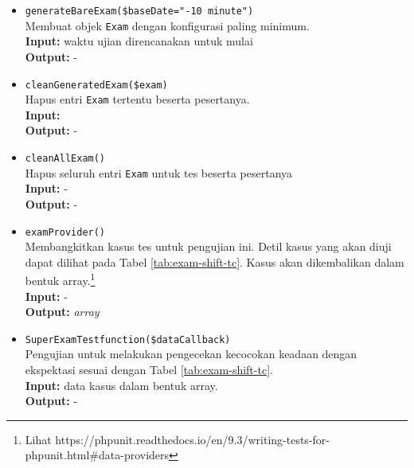 \begin{itemize}
\begin{itemize}
                    \item \texttt{generateBareExam(\$baseDate="-10 minute")} \\
                        Membuat objek \texttt{Exam} dengan konfigurasi paling
                        minimum. \\
                        \textbf{Input:} waktu ujian direncanakan untuk mulai\\
                        \textbf{Output:} -
                    
                    \item \texttt{cleanGeneratedExam(\$exam)} \\
                        Hapus entri \texttt{Exam} tertentu beserta pesertanya.\\
                        \textbf{Input:} \\
                        \textbf{Output:} -
                    
                    \item \texttt{cleanAllExam()} \\
                        Hapus seluruh entri \texttt{Exam} untuk tes beserta
                        pesertanya\\
                        \textbf{Input:} -\\
                        \textbf{Output:} -
                    
                    \item \texttt{examProvider()} \\
                        Membangkitkan kasus tes untuk pengujian ini. Detil kasus
                        yang akan diuji dapat dilihat pada Tabel
                        \ref{tab:exam-shift-tc}. Kasus akan dikembalikan dalam
                        bentuk array.\footnote{Lihat
                        https://phpunit.readthedocs.io/en/9.3/writing-tests-for-phpunit.html\#data-providers}\\
                        \textbf{Input:} -\\
                        \textbf{Output:} \textit{array}
                        
                    
                    \item \texttt{SuperExamTestfunction(\$dataCallback)} \\
                        Pengujian untuk melakukan pengecekan kecocokan keadaan
                        dengan ekspektasi sesuai dengan Tabel
                        \ref{tab:exam-shift-tc}.\\
                        \textbf{Input:} data kasus dalam bentuk array.\\
                        \textbf{Output:} -
                \end{itemize}
    \end{itemize}

